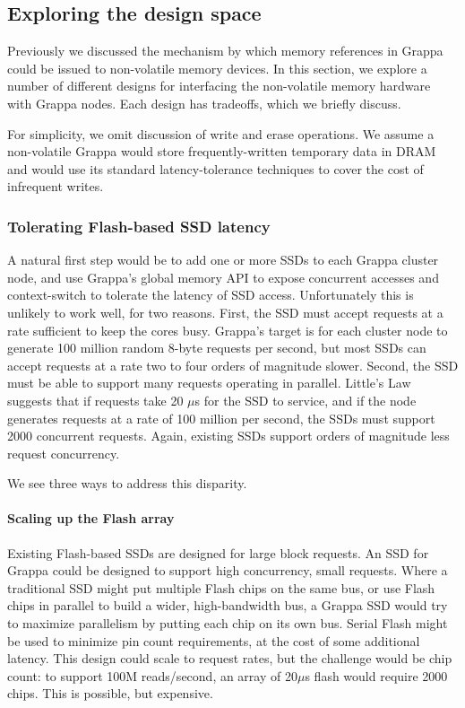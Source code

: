 \subsection{Exploring the design space}

Previously we discussed the mechanism by which memory references in
Grappa could be issued to non-volatile memory devices. In this
section, we explore a number of different designs for interfacing the
non-volatile memory hardware with Grappa nodes. Each design has
tradeoffs, which we briefly discuss.

For simplicity, we omit discussion of write and erase operations. We
assume a non-volatile Grappa would store frequently-written temporary
data in DRAM and would use its standard latency-tolerance techniques
to cover the cost of infrequent writes.

\subsubsection{Tolerating Flash-based SSD latency} 
A natural first step would be to add one or more SSDs to each Grappa
cluster node, and use Grappa's global memory API to expose concurrent
accesses and context-switch to tolerate the latency of SSD
access. Unfortunately this is unlikely to work well, for two
reasons. First, the SSD must accept requests at a rate sufficient to
keep the cores busy. Grappa's target is for each cluster node to
generate 100 million random 8-byte requests per second, but most SSDs
can accept requests at a rate two to four orders of magnitude slower.
Second, the SSD must be able to support many requests operating in
parallel. Little's Law suggests that if requests take 20 $\mu$s for
the SSD to service, and if the node generates requests at a rate of
100 million per second, the SSDs must support 2000 concurrent
requests. Again, existing SSDs support orders of magnitude less request concurrency.

We see three ways to address this disparity.
\paragraph{Scaling up the Flash array}
Existing Flash-based SSDs are designed for large block requests. An
SSD for Grappa could be designed to support high concurrency, small
requests. Where a traditional SSD might put multiple Flash chips on
the same bus, or use Flash chips in parallel to build a wider,
high-bandwidth bus, a Grappa SSD would try to maximize parallelism by
putting each chip on its own bus. Serial Flash might be used to
minimize pin count requirements, at the cost of some additional
latency. This design could scale to request rates, but the challenge
would be chip count: to support 100M reads/second, an array of
20$\mu$s flash would require 2000 chips. This is possible, but expensive.


